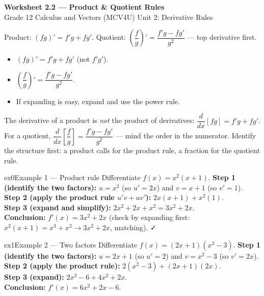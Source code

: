 \documentclass[11pt]{article}
\begin{document}
\begin{center}
{\LARGE\bfseries\color{titleblue}Worksheet 2.2 --- Product \& Quotient Rules}\\[2pt]
{\small Grade 12 Calculus and Vectors (MCV4U) \textperiodcentered{} Unit 2: Derivative Rules}
\end{center}

\begin{ideabox}
Product: $(fg)'=f'g+fg'$. Quotient: $\left(\dfrac fg\right)'=\dfrac{f'g-fg'}{g^2}$ — top derivative first.
\begin{itemize}[leftmargin=*,itemsep=2pt]
  \item $(fg)'=f'g+fg'$ (not $f'g'$).
  \item $\left(\dfrac fg\right)'=\dfrac{f'g-fg'}{g^2}$.
  \item If expanding is easy, expand and use the power rule.
\end{itemize}
\end{ideabox}

\begin{learnbox}
The derivative of a product is \emph{not} the product of derivatives: $\dfrac{d}{dx}[fg]=f'g+fg'$.
For a quotient, $\dfrac{d}{dx}\!\left[\dfrac{f}{g}\right]=\dfrac{f'g-fg'}{g^2}$ — mind the order in the numerator.
Identify the structure first: a product calls for the product rule, a fraction for the quotient rule.
\end{learnbox}


\begin{example}{ex0}{Example 1 --- Product rule}
Differentiate $f(x)=x^2(x+1)$.\soln
\textbf{Step 1 (identify the two factors):} $u=x^2$ (so $u'=2x$) and $v=x+1$ (so $v'=1$).\\[3pt]
\textbf{Step 2 (apply the product rule $u'v+uv'$):} $2x(x+1)+x^2(1)$.\\[3pt]
\textbf{Step 3 (expand and simplify):} $2x^2+2x+x^2=3x^2+2x$.\\[3pt]
\textbf{Conclusion:} $f'(x)=3x^2+2x$ (check by expanding first: $x^2(x+1)=x^3+x^2\to3x^2+2x$, matching). ✓
\end{example}

\begin{example}{ex1}{Example 2 --- Two factors}
Differentiate $f(x)=(2x+1)(x^2-3)$.\soln
\textbf{Step 1 (identify the two factors):} $u=2x+1$ (so $u'=2$) and $v=x^2-3$ (so $v'=2x$).\\[3pt]
\textbf{Step 2 (apply the product rule):} $2(x^2-3)+(2x+1)(2x)$.\\[3pt]
\textbf{Step 3 (expand):} $2x^2-6+4x^2+2x$.\\[3pt]
\textbf{Conclusion:} $f'(x)=6x^2+2x-6$.
\end{example}
\end{document}
